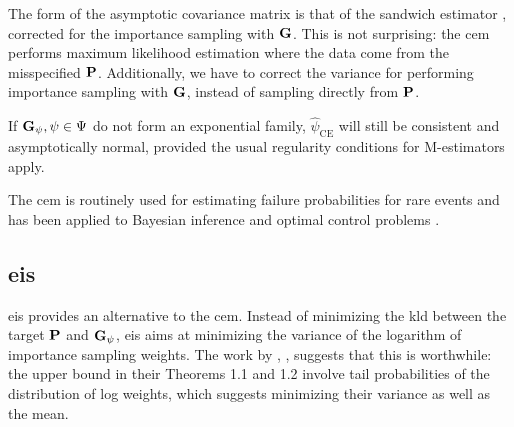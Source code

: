 The form of the asymptotic covariance matrix is that of the sandwich estimator \cite{White1982Maximum}, corrected for the importance sampling with $\G$. This is not surprising: the \gls{cem} performs maximum likelihood estimation where the data come from the misspecified $\P$. Additionally, we have to correct the variance for performing importance sampling with $\G$, instead of sampling directly from $\P$.

If $\G_\psi, \psi \in \Psi$ do not form an exponential family, $\hat\psi_{\text{CE}}$ will still be consistent and asymptotically normal, provided the usual regularity conditions for M-estimators apply. 



The \gls{cem} is routinely used for estimating failure probabilities for rare events \cite{Homem-de-Mello2007Study} and has been applied to Bayesian inference \cite{Engel2023Bayesian,Ehre2023Certified} and optimal control problems \cite{Kappen2016Adaptive,Zhang2014Applications}.

\subsection{\texorpdfstring{\Acrfull{eis}}{Efficient importance sampling}}
\label{subsec:eis}
\gls{eis}\cite{Richard2007Efficient} provides an alternative to the \gls{cem}. Instead of minimizing the \gls{kld} between the target $\P$ and $\G_{\psi}$, \gls{eis} aims at minimizing the variance of the logarithm of importance sampling weights. 
The work by \citep{Chatterjee2018Sample} \cite{Chatterjee2018Sample}, , suggests that this is worthwhile: the upper bound in their Theorems 1.1 and 1.2 involve tail probabilities of the distribution of log weights, which suggests minimizing their variance as well as the mean.


